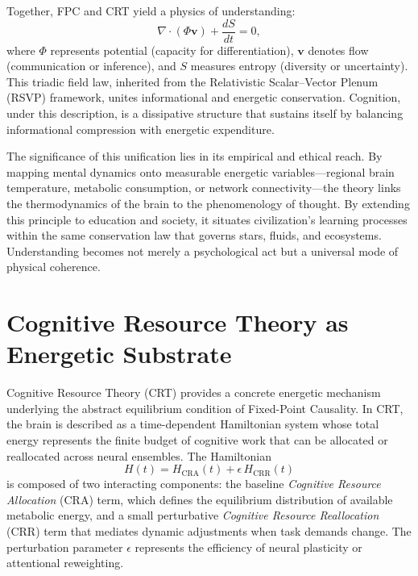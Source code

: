 \documentclass[12pt,a4paper]{article}
\begin{document}
Together, FPC and CRT yield a physics of understanding:
\begin{equation}
\nabla\!\cdot(\Phi\mathbf{v})+\frac{dS}{dt}=0,
\end{equation}
where \(\Phi\) represents potential (capacity for differentiation),
\(\mathbf{v}\) denotes flow (communication or inference), and
\(S\) measures entropy (diversity or uncertainty).
This triadic field law, inherited from the Relativistic Scalar–Vector Plenum (RSVP) framework, unites informational and energetic conservation.
Cognition, under this description, is a dissipative structure that sustains itself by balancing informational compression with energetic expenditure.

The significance of this unification lies in its empirical and ethical reach.
By mapping mental dynamics onto measurable energetic variables---regional brain temperature, metabolic consumption, or network connectivity---the theory links the thermodynamics of the brain to the phenomenology of thought.
By extending this principle to education and society, it situates civilization’s learning processes within the same conservation law that governs stars, fluids, and ecosystems.
Understanding becomes not merely a psychological act but a universal mode of physical coherence.

\section{Cognitive Resource Theory as Energetic Substrate}

Cognitive Resource Theory (CRT) provides a concrete energetic mechanism underlying the abstract equilibrium condition of Fixed-Point Causality.  In CRT, the brain is described as a time-dependent Hamiltonian system whose total energy represents the finite budget of cognitive work that can be allocated or reallocated across neural ensembles.  The Hamiltonian
\begin{equation}
H(t)=H_{\mathrm{CRA}}(t)+\epsilon\,H_{\mathrm{CRR}}(t)
\end{equation}
is composed of two interacting components: the baseline \emph{Cognitive Resource Allocation} (CRA) term, which defines the equilibrium distribution of available metabolic energy, and a small perturbative \emph{Cognitive Resource Reallocation} (CRR) term that mediates dynamic adjustments when task demands change.  The perturbation parameter \(\epsilon\) represents the efficiency of neural plasticity or attentional reweighting.
\end{document}
